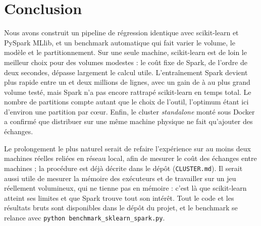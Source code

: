 \documentclass[11pt,a4paper]{article}
\newcommand{\code}[1]{\texttt{#1}}
\begin{document}
\section{Conclusion}

Nous avons construit un pipeline de régression identique avec scikit-learn et PySpark MLlib, et un
benchmark automatique qui fait varier le volume, le modèle et le partitionnement. Sur une seule
machine, scikit-learn est de loin le meilleur choix pour des volumes modestes : le coût fixe de Spark,
de l'ordre de deux secondes, dépasse largement le calcul utile. L'entraînement Spark devient plus
rapide entre un et deux millions de lignes, avec un gain de \gainLRMax{} à \gainRFMax{} au plus grand
volume testé, mais Spark n'a pas encore rattrapé scikit-learn en temps total. Le nombre de partitions
compte autant que le choix de l'outil, l'optimum étant ici d'environ une partition par cœur. Enfin,
le cluster \emph{standalone} monté sous Docker a confirmé que distribuer sur une même machine
physique ne fait qu'ajouter des échanges.

Le prolongement le plus naturel serait de refaire l'expérience sur au moins deux machines réelles
reliées en réseau local, afin de mesurer le coût des échanges entre machines ; la procédure est déjà
décrite dans le dépôt (\code{CLUSTER.md}). Il serait aussi utile de mesurer la mémoire des exécuteurs
et de travailler sur un jeu réellement volumineux, qui ne tienne pas en mémoire : c'est là que
scikit-learn atteint ses limites et que Spark trouve tout son intérêt. Tout le code et les résultats
bruts sont disponibles dans le dépôt du projet, et le benchmark se relance avec
\code{python benchmark\_sklearn\_spark.py}.
\end{document}
